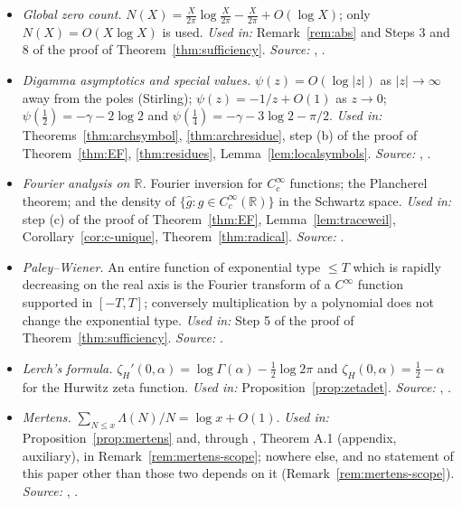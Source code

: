 \documentclass[11pt]{amsart}
\theoremstyle{definition}
\theoremstyle{remark}
\newcommand{\R}{\mathbb R}
\begin{document}
\begin{itemize}
\item[\textbf{(E3d)}] \emph{Global zero count.}
$N(X)=\frac{X}{2\pi}\log\frac X{2\pi}-\frac X{2\pi}+O(\log X)$; only
$N(X)=O(X\log X)$ is used.  \emph{Used in:} Remark~\ref{rem:abs} and Steps 3
and 8 of the proof of Theorem~\ref{thm:sufficiency}.
\emph{Source:} \cite[ch.~15]{Davenport}, \cite[\S5.1]{IK}.

\item[\textbf{(E4)}] \emph{Digamma asymptotics and special values.}
$\psi(z)=O(\log|z|)$ as $|z|\to\infty$ away from the poles (Stirling);
$\psi(z)=-1/z+O(1)$ as $z\to0$; $\psi(\tfrac12)=-\gamma-2\log2$ and
$\psi(\tfrac14)=-\gamma-3\log2-\pi/2$.  \emph{Used in:}
Theorems~\ref{thm:archsymbol}, \ref{thm:archresidue},
step (b) of the proof of Theorem~\ref{thm:EF}, \ref{thm:residues}, Lemma~\ref{lem:localsymbols}.
\emph{Source:} \cite[ch.~5]{NIST}, \cite[ch.~12]{WW}.

\item[\textbf{(E5)}] \emph{Fourier analysis on $\R$.}  Fourier inversion for
$C_c^\infty$ functions; the Plancherel theorem; and the density of
$\{\hat g: g\in C_c^\infty(\R)\}$ in the Schwartz space.  \emph{Used in:}
step (c) of the proof of Theorem~\ref{thm:EF}, Lemma~\ref{lem:traceweil},
Corollary~\ref{cor:c-unique}, Theorem~\ref{thm:radical}.
\emph{Source:} \cite[ch.~7]{Hormander}.

\item[\textbf{(E6)}] \emph{Paley--Wiener.}  An entire function of exponential
type $\le T$ which is rapidly decreasing on the real axis is the Fourier
transform of a $C^\infty$ function supported in $[-T,T]$; conversely
multiplication by a polynomial does not change the exponential type.
\emph{Used in:} Step 5 of the proof of Theorem~\ref{thm:sufficiency}.
\emph{Source:} \cite[Theorem 7.3.1]{Hormander}.

\item[\textbf{(E7)}] \emph{Lerch's formula.}
$\zeta_H'(0,\alpha)=\log\Gamma(\alpha)-\tfrac12\log2\pi$ and
$\zeta_H(0,\alpha)=\tfrac12-\alpha$ for the Hurwitz zeta function.
\emph{Used in:} Proposition~\ref{prop:zetadet}.
\emph{Source:} \cite[\S13.21]{WW}, \cite[ch.~25]{NIST}.

\item[\textbf{(E8)}] \emph{Mertens.}
$\sum_{N\le x}\Lambda(N)/N=\log x+O(1)$.  \emph{Used in:}
Proposition~\ref{prop:mertens} and, through \cite{P43}, Theorem A.1 (appendix, auxiliary), in
Remark~\ref{rem:mertens-scope}; nowhere else, and no statement of this paper
other than those two depends on it (Remark~\ref{rem:mertens-scope}).
\emph{Source:} \cite[\S2.2]{IK}, \cite[ch.~7]{Davenport}.
\end{itemize}
\end{document}

